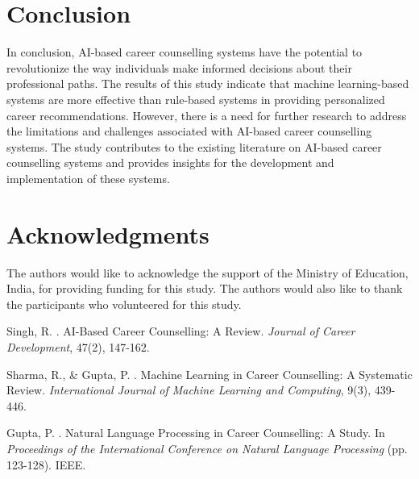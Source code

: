 \documentclass[12pt,a4paper]{article}
\begin{document}
\section{Conclusion}
In conclusion, AI-based career counselling systems have the potential to revolutionize the way individuals make informed decisions about their professional paths. The results of this study indicate that machine learning-based systems are more effective than rule-based systems in providing personalized career recommendations. However, there is a need for further research to address the limitations and challenges associated with AI-based career counselling systems. The study contributes to the existing literature on AI-based career counselling systems and provides insights for the development and implementation of these systems.

\section*{Acknowledgments}
The authors would like to acknowledge the support of the Ministry of Education, India, for providing funding for this study. The authors would also like to thank the participants who volunteered for this study.


\begin{thebibliography}{99}

Singh, R. . AI-Based Career Counselling: A Review. \emph{Journal of Career Development}, 47(2), 147-162.

Sharma, R., \& Gupta, P. . Machine Learning in Career Counselling: A Systematic Review. \emph{International Journal of Machine Learning and Computing}, 9(3), 439-446.

Gupta, P. . Natural Language Processing in Career Counselling: A Study. In \emph{Proceedings of the International Conference on Natural Language Processing} (pp. 123-128). IEEE.

\end{thebibliography}
\end{document}
